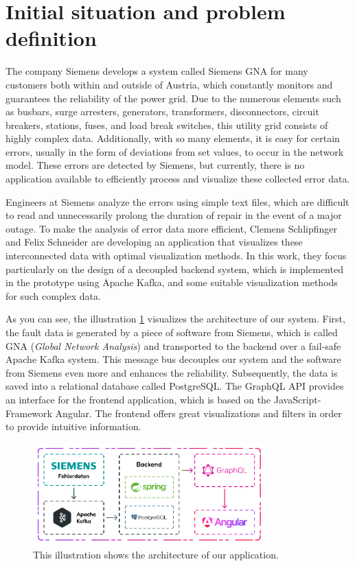 \section{Initial situation and problem definition}

The company Siemens develops a system called Siemens GNA for many customers both within and outside of Austria, which constantly monitors and guarantees the reliability of the power grid. Due to the numerous elements such as busbars, surge arresters, generators, transformers, disconnectors, circuit breakers, stations, fuses, and load break switches, this utility grid consists of highly complex data. Additionally, with so many elements, it is easy for certain errors, usually in the form of deviations from set values, to occur in the network model. These errors are detected by Siemens, but currently, there is no application available to efficiently process and visualize these collected error data.

Engineers at Siemens analyze the errors using simple text files, which are difficult to read and unnecessarily prolong the duration of repair in the event of a major outage. To make the analysis of error data more efficient, Clemens Schlipfinger and Felix Schneider are developing an application that visualizes these interconnected data with optimal visualization methods. In this work, they focus particularly on the design of a decoupled backend system, which is implemented in the prototype using Apache Kafka, and some suitable visualization methods for such complex data.

As you can see, the illustration \ref{fig:architecture_introduction} visualizes the architecture of our system. First, the fault data is generated by a piece of software from Siemens, which is called GNA (\emph{Global Network Analysis}) and transported to the backend over a fail-safe Apache Kafka system. This message bus decouples our system and the software from Siemens even more and enhances the reliability. Subsequently, the data is saved into a relational database called PostgreSQL. The GraphQL API provides an interface for the frontend application, which is based on the JavaScript-Framework Angular. The frontend offers great visualizations and filters in order to provide intuitive information.

\begin{figure}
    \centering
    \includegraphics[width=0.8\textwidth]{content/img/Architecture/Architecture.jpg}
    \caption{This illustration shows the architecture of our application.}
    \label{fig:architecture_introduction}
\end{figure}
\FloatBarrier